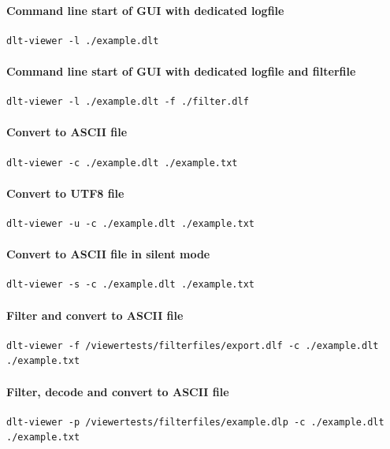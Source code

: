 \documentclass[a4paper,11pt]{article}
\begin{document}
\paragraph{Command line start of GUI with dedicated logfile}
\begin{verbatim}
dlt-viewer -l ./example.dlt
\end{verbatim}

\paragraph{Command line start of GUI with dedicated logfile and filterfile}
\begin{verbatim}
dlt-viewer -l ./example.dlt -f ./filter.dlf
\end{verbatim}


\paragraph{Convert to ASCII file}
\begin{verbatim}
dlt-viewer -c ./example.dlt ./example.txt
\end{verbatim}

\paragraph{Convert to UTF8 file}
\begin{verbatim}
dlt-viewer -u -c ./example.dlt ./example.txt
\end{verbatim}


\paragraph{Convert to ASCII file in silent mode}
\begin{verbatim}
dlt-viewer -s -c ./example.dlt ./example.txt
\end{verbatim}

\paragraph{Filter and convert to ASCII file}
\begin{verbatim}
dlt-viewer -f /viewertests/filterfiles/export.dlf -c ./example.dlt ./example.txt
\end{verbatim}

\paragraph{Filter, decode and convert to ASCII file}
\begin{verbatim}
dlt-viewer -p /viewertests/filterfiles/example.dlp -c ./example.dlt ./example.txt
\end{verbatim}
\end{document}
